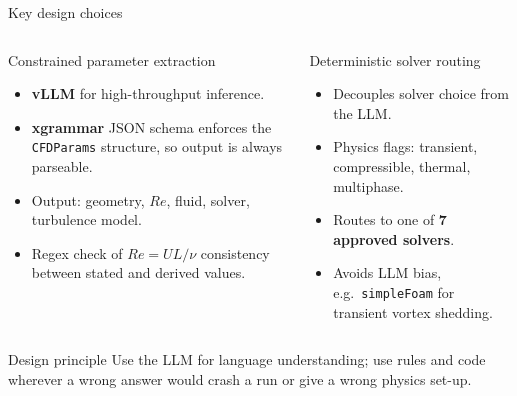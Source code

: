 \documentclass[aspectratio=169,10pt]{beamer}
\begin{document}
\begin{frame}{Key design choices}
\begin{columns}[T,onlytextwidth]
\begin{block}{Constrained parameter extraction}
\begin{itemize}\small
  \item \textbf{vLLM} for high-throughput inference.
  \item \textbf{xgrammar} JSON schema enforces the \texttt{CFDParams} structure, so output is always parseable.
  \item Output: geometry, $Re$, fluid, solver, turbulence model.
  \item Regex check of $Re=UL/\nu$ consistency between stated and derived values.
\end{itemize}
\end{block}
\begin{block}{Deterministic solver routing}
\begin{itemize}\small
  \item Decouples solver choice from the LLM.
  \item Physics flags: transient, compressible, thermal, multiphase.
  \item Routes to one of \textbf{7 approved solvers}.
  \item Avoids LLM bias, e.g.\ \texttt{simpleFoam} for transient vortex shedding.
\end{itemize}
\end{block}
\end{columns}
\vspace{0.1cm}
\begin{block}{Design principle}
\small Use the LLM for language understanding; use rules and code wherever a wrong answer would crash a run or give a wrong physics set-up.
\end{block}
\end{frame}
\end{document}
